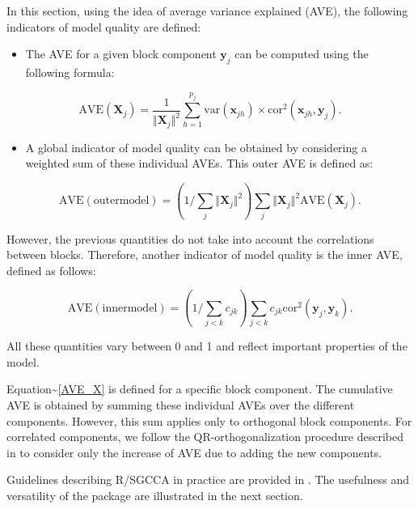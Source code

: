 \documentclass[
]{jss}
\providecommand{\tightlist}{%
  \setlength{\itemsep}{0pt}\setlength{\parskip}{0pt}}
\begin{document}
In this section, using the idea of average variance explained (AVE), the
following indicators of model quality are defined:

\begin{itemize}
\tightlist
\item
  The AVE for a given block component \(\mathbf{y}_j\) can be computed
  using the following formula:
\end{itemize}

\begin{equation}
\mathrm{AVE}(\mathbf X_j)=  \frac{1}{\Vert \mathbf X_j \Vert^2} \sum_{h=1}^{p_j} \text{var}(\mathbf{x}_{jh}) \times \text{cor}^2(\mathbf{x}_{jh},\mathbf{y}_j).
\label{AVE_X}
\end{equation}

\begin{itemize}
\tightlist
\item
  A global indicator of model quality can be obtained by considering a
  weighted sum of these individual AVEs. This outer AVE is defined as:
\end{itemize}

\begin{equation}
\displaystyle \mathrm{AVE(outer model)} = \left( 1/\sum_j \Vert \mathbf X_j \Vert^2 \right) \sum_j \Vert \mathbf X_j \Vert^2 \mathrm{AVE}(\mathbf X_j).
\label{AVE_outer}
\end{equation}

However, the previous quantities do not take into account the
correlations between blocks. Therefore, another indicator of model
quality is the inner AVE, defined as follows:

\begin{equation}
\displaystyle \mathrm{AVE(inner model)} = \left( 1/\sum_{j<k} c_{jk} \right) \sum_{j<k} c_{jk} \mathrm{cor}^2(\mathbf{y}_j , \mathbf{y}_k).
\label{AVE_inner}
\end{equation}

All these quantities vary between 0 and 1 and reflect important
properties of the model.

Equation\textasciitilde{}\ref{AVE_X} is defined for a specific block
component. The cumulative AVE is obtained by summing these individual
AVEs over the different components. However, this sum applies only to
orthogonal block components. For correlated components, we follow the
QR-orthogonalization procedure described in \cite{Zou2006} to consider
only the increase of AVE due to adding the new components.

Guidelines describing R/SGCCA in practice are provided in
\cite{Garali2018}. The usefulness and versatility of the 
package are illustrated in the next section.
\end{document}
